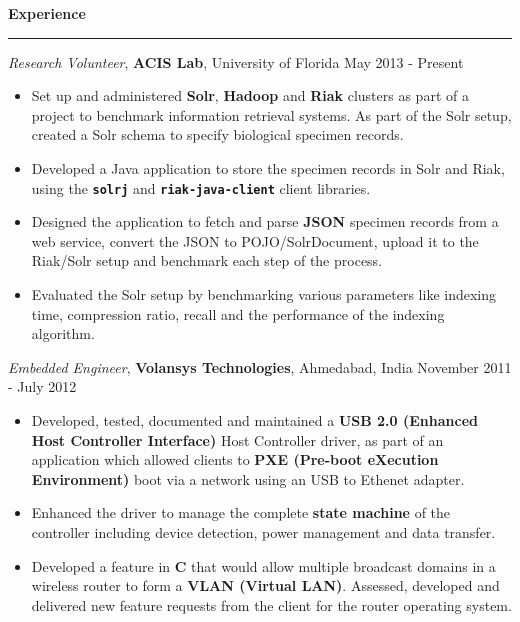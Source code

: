 \documentclass[10pt]{article}
\begin{document}
\textbf{Experience}
\smallskip
\hrule
\textit{Research Volunteer}, {\bf ACIS Lab}, University of Florida \hfill May 2013 - Present
\begin{itemize}
    \item Set up and administered \textbf{Solr}, \textbf{Hadoop} and \textbf{Riak} 
clusters as part of a project to benchmark information retrieval systems. As part of the Solr setup, created a Solr schema to specify biological specimen records.
    \item Developed a Java application to store the specimen records in Solr and Riak, using the \texttt{\bf solrj} and \texttt{\bf riak-java-client} client libraries.
    \item Designed the application to fetch and parse \textbf{JSON} specimen records from a web service, convert the JSON to POJO/SolrDocument, upload it to the Riak/Solr
setup and benchmark each step of the process.
    \item Evaluated the Solr setup by benchmarking various parameters like indexing time, compression ratio, recall and the performance of the indexing algorithm.
\end{itemize}

\textit{Embedded Engineer}, {\bf Volansys Technologies}, Ahmedabad, India \hfill November 2011 - July 2012
\begin{itemize}
    \item Developed, tested, documented and maintained a \textbf{USB 2.0 (Enhanced Host Controller Interface)} 
Host Controller driver, as part of an application which allowed clients to \textbf{PXE (Pre-boot eXecution Environment)} 
boot via a network using an USB to Ethenet adapter. 
    \item Enhanced the driver to manage the complete \textbf{state machine} of the controller 
including device detection, power management and data transfer. %
    \item Developed a feature in \textbf{C} that would allow multiple broadcast domains in a wireless 
router to form a \textbf{VLAN (Virtual LAN)}. Assessed, developed and delivered new feature requests from the 
client for the router operating system.
\end{itemize}
\end{document}
